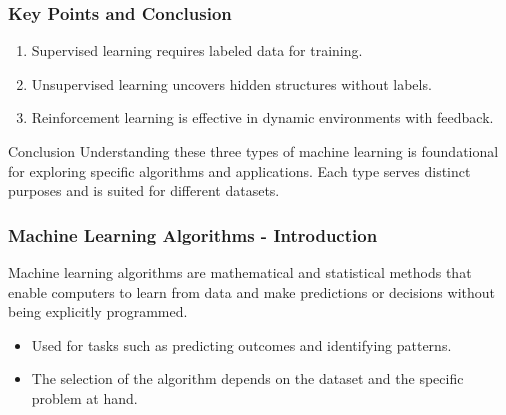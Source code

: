 \documentclass[aspectratio=169]{beamer}
\begin{document}
\begin{frame}[fragile]
    \frametitle{Key Points and Conclusion}
    \begin{enumerate}
        \item Supervised learning requires labeled data for training.
        \item Unsupervised learning uncovers hidden structures without labels.
        \item Reinforcement learning is effective in dynamic environments with feedback.
    \end{enumerate}
    
    \begin{block}{Conclusion}
        Understanding these three types of machine learning is foundational for exploring specific algorithms and applications. Each type serves distinct purposes and is suited for different datasets.
    \end{block}
\end{frame}

\begin{frame}[fragile]
    \frametitle{Machine Learning Algorithms - Introduction}
    Machine learning algorithms are mathematical and statistical methods that enable computers to learn from data and make predictions or decisions without being explicitly programmed.
    \begin{itemize}
        \item Used for tasks such as predicting outcomes and identifying patterns.
        \item The selection of the algorithm depends on the dataset and the specific problem at hand.
    \end{itemize}
\end{frame}
\end{document}
